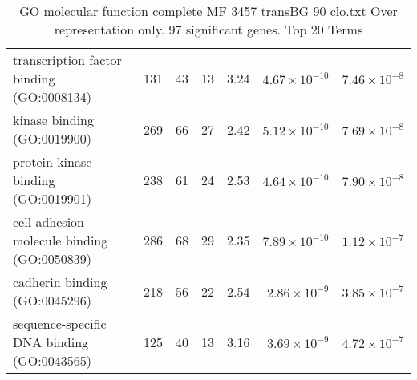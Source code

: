 \begin{table}[ht]
\begin{adjustbox}{width=\textwidth}
\begin{tabular}{lrrrlrr}
  transcription factor binding (GO:0008134) & 131 & 43 & 13 & 3.24 & $4.67 \times 10^{-10}$ & $7.46 \times 10^{-8}$ \\ 
  kinase binding (GO:0019900) & 269 & 66 & 27 & 2.42 & $5.12 \times 10^{-10}$ & $7.69 \times 10^{-8}$ \\ 
  protein kinase binding (GO:0019901) & 238 & 61 & 24 & 2.53 & $4.64 \times 10^{-10}$ & $7.90 \times 10^{-8}$ \\ 
  cell adhesion molecule binding (GO:0050839) & 286 & 68 & 29 & 2.35 & $7.89 \times 10^{-10}$ & $1.12 \times 10^{-7}$ \\ 
  cadherin binding (GO:0045296) & 218 & 56 & 22 & 2.54 & $2.86 \times 10^{-9}$ & $3.85 \times 10^{-7}$ \\ 
  sequence-specific DNA binding (GO:0043565) & 125 & 40 & 13 & 3.16 & $3.69 \times 10^{-9}$ & $4.72 \times 10^{-7}$ \\ 
   \hline
\end{tabular}
\end{adjustbox}
\caption{GO molecular function complete MF 3457 transBG 90 clo.txt Over representation only. 97 significant genes. Top 20 Terms} 
\label{tab:GO molecular function complete MF 3457 transBG 90 clo.txt Over representation only. 97 significant genes. Top 20 Terms}
\end{table}



